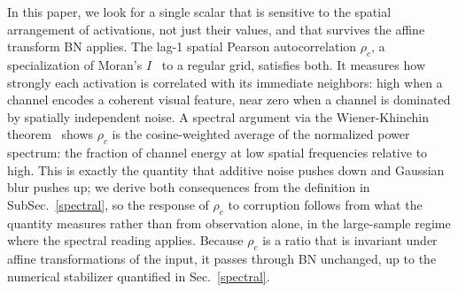 \documentclass{bmvc2k}
\begin{document}

In this paper, we look for a single scalar that is sensitive to the spatial arrangement of activations, not just their values, and that survives the affine transform BN applies. The lag-1 spatial Pearson autocorrelation $\rho_c$, a specialization of Moran's $I$~\cite{moran1950} to a regular grid, satisfies both. It measures how strongly each activation is correlated with its immediate neighbors: high when a channel encodes a coherent visual feature, near zero when a channel is dominated by spatially independent noise. A spectral argument via the Wiener-Khinchin theorem~\cite{wiener1930,khintchine1934} shows $\rho_c$ is the cosine-weighted average of the normalized power spectrum: the fraction of channel energy at low spatial frequencies relative to high. This is exactly the quantity that additive noise pushes down and Gaussian blur pushes up; we derive both consequences from the definition in SubSec.~\ref{spectral}, so the response of $\rho_c$ to corruption follows from what the quantity measures rather than from observation alone, in the large-sample regime where the spectral reading applies. Because $\rho_c$ is a ratio that is invariant under affine transformations of the input, it passes through BN unchanged, up to the numerical stabilizer quantified in Sec.~\ref{spectral}.
\end{document}
